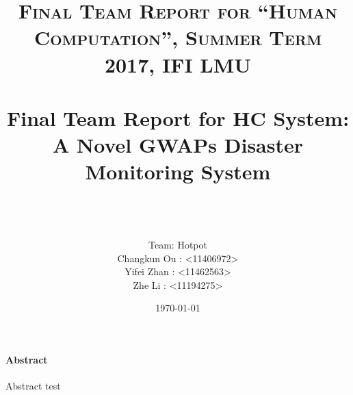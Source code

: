 \documentclass[paper=a4, fontsize=11pt]{scrartcl}
\title{	
\normalfont \normalsize 
\textsc{Final Team Report for ``Human Computation'', Summer Term 2017, IFI LMU} \\ [25pt]
\horrule{0.5pt} \\[0.4cm]
\huge Final Team Report for HC System: \\
A Novel GWAPs Disaster Monitoring System\\
\horrule{2pt} \\[0.5cm] %
}
\author{
  \\ Team: Hotpot\\
  Changkun Ou : <11406972> \\
  Yifei Zhan : <11462563> \\
  Zhe Li : <11194275>  }
\date{\today}
\theoremstyle{definition}
\numberwithin{equation}{section}
\numberwithin{figure}{section}
\numberwithin{table}{section}
\begin{document}
\maketitle

\tableofcontents

\paragraph{Abstract}

Abstract test







\nocite{*}


\end{document}
